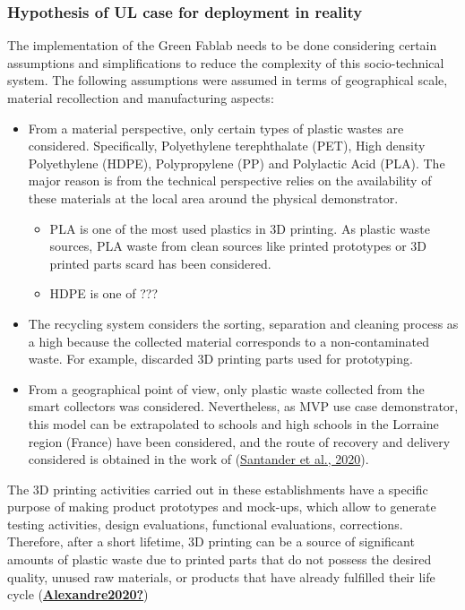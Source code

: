 \documentclass[
  11pt,
]{article}
\begin{document}
\hypertarget{hypothesis-of-ul-case-for-deployment-in-reality}{%
\subsubsection{Hypothesis of UL case for deployment in
reality}\label{hypothesis-of-ul-case-for-deployment-in-reality}}

The implementation of the Green Fablab needs to be done considering
certain assumptions and simplifications to reduce the complexity of this
socio-technical system. The following assumptions were assumed in terms
of geographical scale, material recollection and manufacturing aspects:

\begin{itemize}
\item
  From a material perspective, only certain types of plastic wastes are
  considered. Specifically, Polyethylene terephthalate (PET), High
  density Polyethylene (HDPE), Polypropylene (PP) and Polylactic Acid
  (PLA). The major reason is from the technical perspective relies on
  the availability of these materials at the local area around the
  physical demonstrator.

  \begin{itemize}
  \item
    PLA is one of the most used plastics in 3D printing. As plastic
    waste sources, PLA waste from clean sources like printed prototypes
    or 3D printed parts scard has been considered.
  \item
    HDPE is one of ???
  \end{itemize}
\item
  The recycling system considers the sorting, separation and cleaning
  process as a high because the collected material corresponds to a
  non-contaminated waste. For example, discarded 3D printing parts used
  for prototyping.
\item
  From a geographical point of view, only plastic waste collected from
  the smart collectors was considered. Nevertheless, as MVP use case
  demonstrator, this model can be extrapolated to schools and high
  schools in the Lorraine region (France) have been considered, and the
  route of recovery and delivery considered is obtained in the work of
  (\protect\hyperlink{ref-Santander2020}{Santander et al., 2020}).
\end{itemize}

The 3D printing activities carried out in these establishments have a
specific purpose of making product prototypes and mock-ups, which allow
to generate testing activities, design evaluations, functional
evaluations, corrections. Therefore, after a short lifetime, 3D printing
can be a source of significant amounts of plastic waste due to printed
parts that do not possess the desired quality, unused raw materials, or
products that have already fulfilled their life cycle
(\protect\hyperlink{ref-Alexandre2020}{\textbf{Alexandre2020?}})
\end{document}
